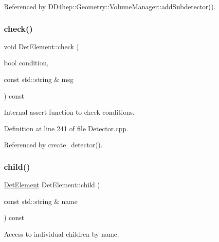 Referenced by D\+D4hep\+::\+Geometry\+::\+Volume\+Manager\+::add\+Subdetector().

\hypertarget{class_d_d4hep_1_1_geometry_1_1_det_element_aee32c6df93ab1cb7d6dc36e7ae855112}{}\label{class_d_d4hep_1_1_geometry_1_1_det_element_aee32c6df93ab1cb7d6dc36e7ae855112} 
\subsubsection{\texorpdfstring{check()}{check()}}
{\footnotesize\ttfamily void Det\+Element\+::check (\begin{DoxyParamCaption}\item[{bool}]{condition,  }\item[{const std\+::string \&}]{msg }\end{DoxyParamCaption}) const}



Internal assert function to check conditions. 



Definition at line 241 of file Detector.\+cpp.



Referenced by create\+\_\+detector().

\hypertarget{class_d_d4hep_1_1_geometry_1_1_det_element_a4ba5423e142412e274ce398afc9009fb}{}\label{class_d_d4hep_1_1_geometry_1_1_det_element_a4ba5423e142412e274ce398afc9009fb} 
\subsubsection{\texorpdfstring{child()}{child()}}
{\footnotesize\ttfamily \hyperlink{class_d_d4hep_1_1_geometry_1_1_det_element}{Det\+Element} Det\+Element\+::child (\begin{DoxyParamCaption}\item[{const std\+::string \&}]{name }\end{DoxyParamCaption}) const}



Access to individual children by name. 



